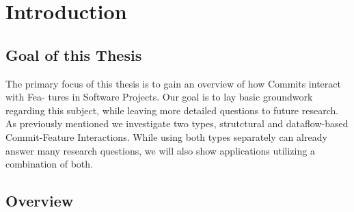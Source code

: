 \section*{Introduction}\label{ch:introduction}

\subsection*{Goal of this Thesis}

The primary focus of this thesis is to gain an overview of how Commits interact with Fea-
tures in Software Projects. Our goal is to lay basic groundwork regarding this
subject, while leaving more detailed questions to future research. As previously mentioned
we investigate two types, strutctural and dataflow-based Commit-Feature Interactions. While
using both types separately can already answer many research questions, we will also show
applications utilizing a combination of both.

\subsection*{Overview}

